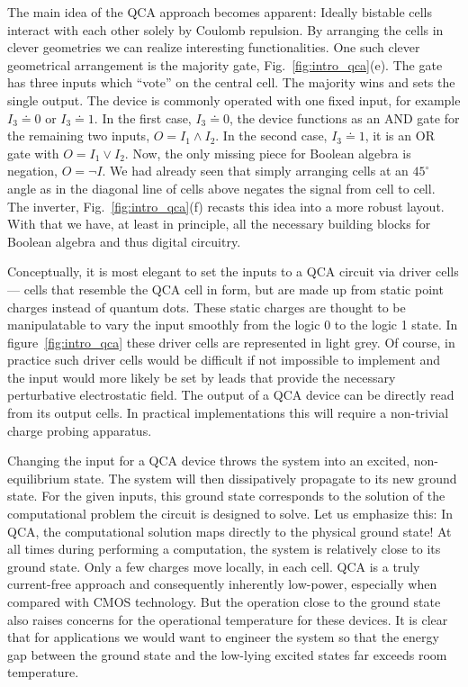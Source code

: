 The main idea of the QCA approach becomes apparent: Ideally bistable cells
interact with each other solely by Coulomb repulsion. By arranging the cells in
clever geometries we can realize interesting functionalities. One such clever
geometrical arrangement is the majority gate, Fig.~\ref{fig:intro_qca}(e). The
gate has three inputs which ``vote'' on the central cell. The majority wins and
sets the single output. The device is commonly operated with one fixed input,
for example $I_3 \doteq 0$ or $I_3 \doteq 1$. In the first case, $I_3 \doteq 0$,
the device functions as an AND gate for the remaining two inputs, $O = I_1 \land
I_2$. In the second case, $I_3 \doteq 1$, it is an OR gate with $O = I_1 \lor
I_2$. Now, the only missing piece for Boolean algebra is negation, $O = \lnot
I$. We had already seen that simply arranging cells at an $45^{\circ}$ angle as
in the diagonal line of cells above negates the signal from cell to cell. The
inverter, Fig.~\ref{fig:intro_qca}(f) recasts this idea into a more robust
layout. With that we have, at least in principle, all the necessary building
blocks for Boolean algebra and thus digital circuitry.

Conceptually, it is most elegant to set the inputs to a QCA circuit via driver
cells --- cells that resemble the QCA cell in form, but are made up from static
point charges instead of quantum dots. These static charges are thought to be
manipulatable to vary the input smoothly from the logic 0 to the logic 1 state.
In figure~\ref{fig:intro_qca} these driver cells are represented in light grey.
Of course, in practice such driver cells would be difficult if not impossible to
implement and the input would more likely be set by leads that provide the
necessary perturbative electrostatic field. The output of a QCA device can be
directly read from its output cells. In practical implementations this will
require a non-trivial charge probing apparatus.

Changing the input for a QCA device throws the system into an excited,
non-equilibrium state. The system will then dissipatively propagate to its new
ground state. For the given inputs, this ground state corresponds to the
solution of the computational problem the circuit is designed to solve. Let us
emphasize this: In QCA, the computational solution maps directly to the physical
ground state! At all times during performing a computation, the system is
relatively close to its ground state. Only a few charges move locally, in each
cell. QCA is a truly current-free approach and consequently inherently
low-power, especially when compared with CMOS technology. But the operation
close to the ground state also raises concerns for the operational temperature
for these devices. It is clear that for applications we would want to engineer
the system so that the energy gap between the ground state and the low-lying
excited states far exceeds room temperature.

